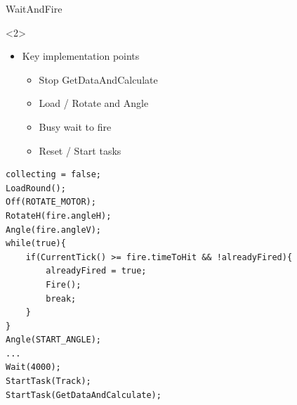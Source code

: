 \begin{frame}[fragile]{WaitAndFire}
\begin{onlyenv}<2>
\begin{itemize}
  \item Key implementation points
  	\begin{itemize}
  		\item Stop GetDataAndCalculate
  		\item Load / Rotate and Angle
  		\item Busy wait to fire
  		\item Reset / Start tasks 
	\end{itemize}
\end{itemize}
\begin{center}
\begin{minipage}[H]{0.9\linewidth}
\begin{lstlisting}
collecting = false;
LoadRound();
Off(ROTATE_MOTOR);
RotateH(fire.angleH);
Angle(fire.angleV);
while(true){
	if(CurrentTick() >= fire.timeToHit && !alreadyFired){
    	alreadyFired = true;
        Fire();
        break;
    }
}
Angle(START_ANGLE);
...
Wait(4000);
StartTask(Track);
StartTask(GetDataAndCalculate);
\end{lstlisting} 
\end{minipage}
\end{center}
\end{onlyenv}
\end{frame}

